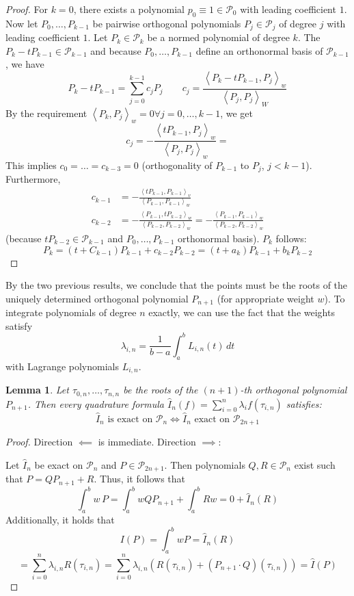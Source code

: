 \documentclass[a4paper]{article}
\newcounter{lecref}[section]
\numberwithin{lecref}{section}
\theoremstyle{break}
\newtheorem{lemma}[lecref]{Lemma}
\newcommand{\IP}[2]{\left\langle#1, #2\right\rangle}
\begin{document}
\begin{proof}
  For $k = 0$, there exists a polynomial $p_0 \equiv 1 \in \mathcal P_0$ with leading coefficient $1$.
  Now let $P_0, \dots, P_{k-1}$ be pairwise orthogonal polynomials $P_j \in \mathcal P_j$ of degree $j$ with leading coefficient $1$. Let $P_k \in \mathcal P_k$ be a normed polynomial of degree $k$. The $P_k - t P_{k-1} \in \mathcal P_{k-1}$ and because $P_0, \dots, P_{k-1}$ define an orthonormal basis of $\mathcal P_{k-1}$, we have
  \[ P_k - t P_{k-1} = \sum_{j=0}^{k-1} c_j P_j \qquad c_j = \frac{\IP{P_k - t P_{k-1}}{P_j}_w}{\IP{P_j}{P_j}_W} \]
  By the requirement $\IP{P_k}{P_j}_w = 0 \forall j = 0, \dots, k-1$, we get
  \[ c_j = -\frac{\IP{t P_{k-1}}{P_j}_w}{\IP{P_j}{P_j}_w} =  \]
  This implies $c_0 = \dots = c_{k-3} = 0$ (orthogonality of $P_{k-1}$ to $P_j$, $j < k-1$).
  Furthermore,
  \begin{align*}
    c_{k-1} &= -\frac{\IP{t P_{k-1}}{P_{k-1}}_v}{\IP{P_{k-1}}{P_{k-1}}_w} \\
    c_{k-2} &= -\frac{\IP{P_{k-1}}{t P_{k-2}}_w}{\IP{P_{k-2}}{P_{k-2}}_w}
            = -\frac{\IP{P_{k-1}}{P_{k-1}}_w}{\IP{P_{k-2}}{P_{k-2}}_w}
  \end{align*}
  (because $t P_{k-2} \in \mathcal P_{k-1}$ and $P_0, \dots, P_{k-1}$ orthonormal basis).
  $P_k$ follows:
  \[ P_k = (t + C_{k-1}) P_{k-1} + c_{k-2} P_{k-2} = (t + a_k) P_{k-1} + b_k P_{k-2} \]
\end{proof}

By the two previous results, we conclude that the points must be the roots of the uniquely determined orthogonal polynomial $P_{n+1}$ (for appropriate weight $w$). To integrate polynomials of degree $n$ exactly, we can use the fact that the weights satisfy
\[ \lambda_{i,n} = \frac{1}{b - a} \int_a^b L_{i,n}(t) \, dt \]
with Lagrange polynomials $L_{i,n}$.

\begin{lemma}
  \label{lemma:5-12}
  Let $\tau_{0,n}, \dots, \tau_{n,n}$ be the roots of the $(n+1)$-th orthogonal polynomial $P_{n+1}$. Then every quadrature formula $\hat{I}_n(f) = \sum_{i=0}^n \lambda_i f(\tau_{i,n})$ satisfies:
  \[ \hat{I}_n \text{ is exact on } \mathcal P_n \iff \hat{I}_n \text{ exact on } \mathcal P_{2n+1} \]
\end{lemma}

\begin{proof}
  Direction $\impliedby$ is immediate. Direction $\implies$:

  Let $\hat{I}_n$ be exact on $\mathcal P_n$ and $P \in \mathcal P_{2n+1}$.
  Then polynomials $Q, R \in \mathcal P_n$ exist such that $P = QP_{n+1} + R$. Thus, it follows that
  \[ \int_a^b w \, P = \int_a^b w Q P_{n+1} + \int_a^b R w = 0 + \hat{I}_n(R) \]
  Additionally, it holds that
  \[ I(P) = \int_a^b w P = \hat{I}_n(R) \]
  \[ = \sum_{i=0}^n \lambda_{i,n} R(\tau_{i,n}) = \sum_{i=0}^n \lambda_{i,n}\left(R(\tau_{i,n}) + (P_{n+1} \cdot Q)(\tau_{i,n})\right) = \hat{I}(P) \]
\end{proof}
\end{document}
